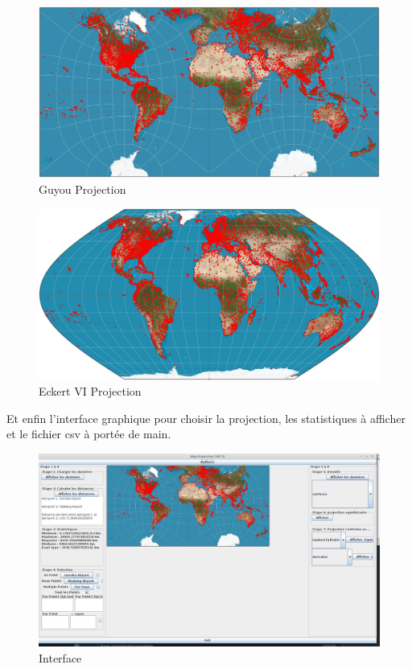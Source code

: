 \documentclass{article}
\begin{document}
		\begin{figure}[H]
		\centering
		\includegraphics[scale=0.25]{guyou_result.jpg}
		\caption{Guyou Projection}
		\label{fig:etape7g}
	\end{figure}
	
			\begin{figure}[H]
		\centering
		\includegraphics[scale=0.25]{eckertVI_result.jpg}
		\caption{Eckert VI Projection}
		\label{fig:etape7eckVI}
	\end{figure}
	
	Et enfin l'interface graphique pour choisir la projection, les statistiques à afficher et le fichier csv à portée de main.
	
			\begin{figure}[H]
		\centering
		\includegraphics[scale=0.3]{Interface.png}
		\caption{Interface}
		\label{fig:etape7inter}
	\end{figure}
\end{document}

